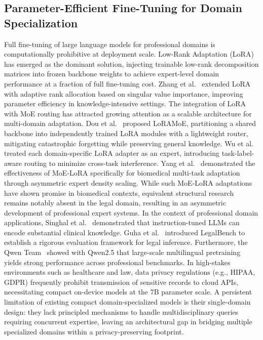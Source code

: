 \documentclass[a4paper,fleql]{cas-sc}
\begin{document}
\subsection{Parameter-Efficient Fine-Tuning for Domain Specialization}
Full fine-tuning of large language models for professional domains is
computationally prohibitive at deployment scale. Low-Rank Adaptation
(LoRA) \citep{hu2022lora} has emerged as the dominant solution, injecting
trainable low-rank decomposition matrices into frozen backbone weights to
achieve expert-level domain performance at a fraction of full fine-tuning
cost. Zhang et al.\ \citep{zhang2023adalora} extended LoRA with adaptive rank
allocation based on singular value importance, improving parameter efficiency
in knowledge-intensive settings.
The integration of LoRA with MoE routing has attracted growing attention as a
scalable architecture for multi-domain adaptation. Dou et al.\ \citep{dou2024loramoe}
proposed LoRAMoE, partitioning a shared backbone into independently trained
LoRA modules with a lightweight router, mitigating catastrophic forgetting
while preserving general knowledge. Wu et al.\ \citep{wu2024mixtureofloras}
treated each domain-specific LoRA adapter as an expert, introducing
task-label-aware routing to minimize cross-task interference. Yang et al.\
\citep{yang2025medmoelora} demonstrated the effectiveness of MoE-LoRA
specifically for biomedical multi-task adaptation through asymmetric expert
density scaling. While such MoE-LoRA adaptations have shown promise in
biomedical contexts, equivalent structural research remains notably absent in
the legal domain, resulting in an asymmetric development of professional expert
systems.
In the context of professional domain applications, Singhal et al.\
\citep{singhal2023large} demonstrated that instruction-tuned LLMs can encode
substantial clinical knowledge. Guha et al.\ \citep{guha2023legalbench}
introduced LegalBench to establish a rigorous evaluation framework for legal
inference. Furthermore, the Qwen Team\ \citep{qwen2025qwen25} showed with
Qwen2.5 that large-scale multilingual pretraining yields strong performance
across professional benchmarks.
In high-stakes environments such as healthcare and law, data privacy
regulations (e.g., HIPAA, GDPR) frequently prohibit transmission of sensitive
records to cloud APIs, necessitating compact on-device models at the 7B
parameter scale. A persistent limitation of existing compact domain-specialized
models is their single-domain design: they lack principled mechanisms to
handle multidisciplinary queries requiring concurrent expertise, leaving an
architectural gap in bridging multiple specialized domains within a
privacy-preserving footprint.
\end{document}
